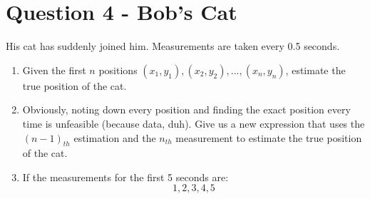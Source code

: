 \documentclass[a4paper, 12pt]{exam}
\begin{document}
	
	\pagebreak
	\section*{Question 4 - Bob's Cat}
	His cat has suddenly joined him. Measurements are taken every 0.5 seconds.
	\begin{enumerate}[label = (\alph*)]
		\item Given the first $n$ positions ${(x_1, y_1), (x_2, y_2), ... , (x_n, y_n)}$, estimate the true position of the cat.
		\item Obviously, noting down every position and finding the exact position every time is unfeasible (because data, duh). Give us a new expression that uses the $(n-1)_{th}$ estimation and the $n_{th}$ measurement to estimate the true position of the cat.
		\item If the measurements for the first 5 seconds are:
		\begin{equation*}
			1,2,3,4,5
		\end{equation*}
	\end{enumerate}

\end{document}

